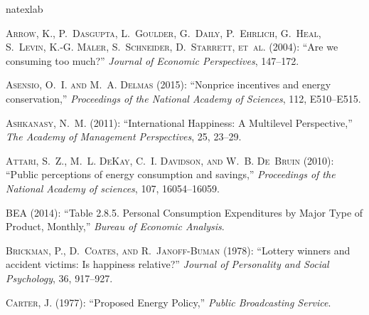 \documentclass[10pt, letterpaper]{article}
\begin{document}
\begin{spacing}{1.0}


\newpage %
%
\begin{thebibliography}{49}
\newcommand{\enquote}[1]{``#1''}
\expandafter\ifx\csname natexlab\endcsname\relax\def\natexlab#1{#1}\fi

\textsc{Arrow, K., P.~Dasgupta, L.~Goulder, G.~Daily, P.~Ehrlich, G.~Heal,
  S.~Levin, K.-G. M{\"a}ler, S.~Schneider, D.~Starrett, et~al.} (2004):
  \enquote{Are we consuming too much?} \emph{Journal of Economic Perspectives},
  147--172.

\textsc{Asensio, O.~I. and M.~A. Delmas} (2015): \enquote{Nonprice incentives
  and energy conservation,} \emph{Proceedings of the National Academy of
  Sciences}, 112, E510--E515.

\textsc{Ashkanasy, N.~M.} (2011): \enquote{International Happiness: A
  Multilevel Perspective,} \emph{The Academy of Management Perspectives}, 25,
  23--29.

\textsc{Attari, S.~Z., M.~L. DeKay, C.~I. Davidson, and W.~B. De~Bruin} (2010):
  \enquote{Public perceptions of energy consumption and savings,}
  \emph{Proceedings of the National Academy of sciences}, 107, 16054--16059.

\textsc{BEA} (2014): \enquote{Table 2.8.5. Personal Consumption Expenditures by
  Major Type of Product, Monthly,} \emph{Bureau of Economic Analysis}.

\textsc{Brickman, P., D.~Coates, and R.~Janoff-Buman} (1978): \enquote{Lottery
  winners and accident victims: Is happiness relative?} \emph{Journal of
  Personality and Social Psychology}, 36, 917--927.

\textsc{Carter, J.} (1977): \enquote{Proposed Energy Policy,} \emph{Public
  Broadcasting Service}.


\end{thebibliography}
\end{spacing}
\end{document}
